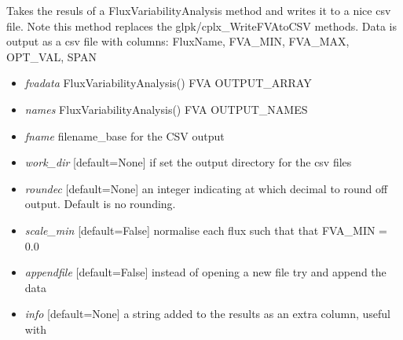 \documentclass[a4paper,11pt,english]{sphinxmanual}
\begin{document}

\begin{fulllineitems}
\label{modules_doc:cbmpy.CBWrite.writeFVAdata}
Takes the resuls of a FluxVariabilityAnalysis method and writes it to a nice
csv file. Note this method replaces the glpk/cplx\_WriteFVAtoCSV methods. Data is output as a csv file
with columns: FluxName, FVA\_MIN, FVA\_MAX, OPT\_VAL, SPAN
\begin{itemize}
\item {} 
\emph{fvadata} FluxVariabilityAnalysis() FVA OUTPUT\_ARRAY

\item {} 
\emph{names} FluxVariabilityAnalysis() FVA OUTPUT\_NAMES

\item {} 
\emph{fname} filename\_base for the CSV output

\item {} 
\emph{work\_dir} {[}default=None{]} if set the output directory for the csv files

\item {} 
\emph{roundec} {[}default=None{]} an integer indicating at which decimal to round off output. Default is no rounding.

\item {} 
\emph{scale\_min} {[}default=False{]} normalise each flux such that that FVA\_MIN = 0.0

\item {} 
\emph{appendfile} {[}default=False{]} instead of opening a new file try and append the data

\item {} 
\emph{info} {[}default=None{]} a string added to the results as an extra column, useful with 

\end{itemize}

\end{fulllineitems}

\end{document}
